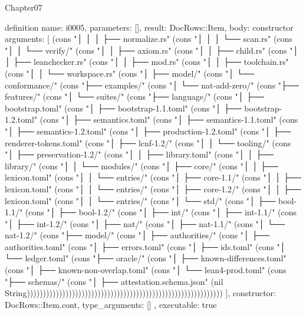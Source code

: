 \begin{lexlean}{Chapter07}
\begin{semanticmodule}
definition{
  name: i0005,
  parameters: [],
  result: DocRows::Item,
  body: constructor{
    arguments: [
      (cons "│   │       │   ├── normalize.rs" (cons "│   │       │   └── scan.rs" (cons "│   │       └── verify/" (cons "│   │           ├── axiom.rs" (cons "│   │           ├── child.rs" (cons "│   │           ├── leanchecker.rs" (cons "│   │           ├── mod.rs" (cons "│   │           ├── toolchain.rs" (cons "│   │           └── workspace.rs" (cons "│   ├── model/" (cons "│   └── conformance/" (cons "├── examples/" (cons "│   └── nat-add-zero/" (cons "├── features/" (cons "│   └── suites/" (cons "├── language/" (cons "│   ├── bootstrap.toml" (cons "│   ├── bootstrap-1.1.toml" (cons "│   ├── bootstrap-1.2.toml" (cons "│   ├── semantics.toml" (cons "│   ├── semantics-1.1.toml" (cons "│   ├── semantics-1.2.toml" (cons "│   ├── production-1.2.toml" (cons "│   ├── renderer-tokens.toml" (cons "│   ├── lcnf-1.2/" (cons "│   │   └── tooling/" (cons "│   ├── preservation-1.2/" (cons "│   │   ├── library.toml" (cons "│   │   ├── library/" (cons "│   │   └── modules/" (cons "│   ├── core/" (cons "│   │   ├── lexicon.toml" (cons "│   │   └── entries/" (cons "│   ├── core-1.1/" (cons "│   │   ├── lexicon.toml" (cons "│   │   └── entries/" (cons "│   ├── core-1.2/" (cons "│   │   ├── lexicon.toml" (cons "│   │   └── entries/" (cons "│   └── std/" (cons "│       ├── bool-1.1/" (cons "│       ├── bool-1.2/" (cons "│       ├── int/" (cons "│       ├── int-1.1/" (cons "│       ├── int-1.2/" (cons "│       ├── nat/" (cons "│       ├── nat-1.1/" (cons "│       └── nat-1.2/" (cons "├── model/" (cons "│   ├── authorities/" (cons "│   ├── authorities.toml" (cons "│   ├── errors.toml" (cons "│   ├── ids.toml" (cons "│   └── ledger.toml" (cons "├── oracle/" (cons "│   ├── known-differences.toml" (cons "│   ├── known-non-overlap.toml" (cons "│   └── lean4-prod.toml" (cons "├── schemas/" (cons "│   ├── attestation.schema.json" (nil String)))))))))))))))))))))))))))))))))))))))))))))))))))))))))))))
    ],
    constructor: DocRows::Item.cont,
    type_arguments: []
  },
  executable: true
}


\end{semanticmodule}
\end{lexlean}
